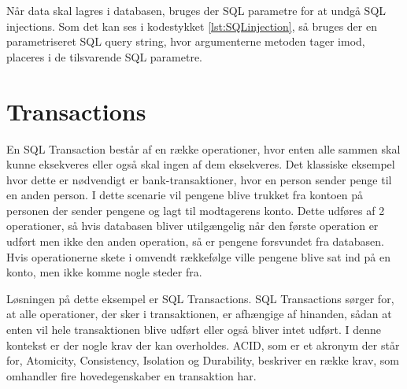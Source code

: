Når data skal lagres i databasen, bruges der SQL parametre for at undgå SQL injections. Som det kan ses i kodestykket \ref{lst:SQLinjection}, så bruges der en parametriseret SQL query string, hvor argumenterne metoden tager imod, placeres i de tilsvarende SQL parametre.


\section{Transactions}\label{sec:transactions}
En SQL Transaction \cite{sqltransaction} består af en række operationer, hvor enten alle sammen skal kunne eksekveres eller også skal ingen af dem eksekveres. Det klassiske eksempel hvor dette er nødvendigt er bank-transaktioner, hvor en person sender penge til en anden person. I dette scenarie vil pengene blive trukket fra kontoen på personen der sender pengene og lagt til modtagerens konto. Dette udføres af 2 operationer, så hvis databasen bliver utilgængelig når den første operation er udført men ikke den anden operation, så er pengene forsvundet fra databasen. Hvis operationerne skete i omvendt rækkefølge ville pengene blive sat ind på en konto, men ikke komme nogle steder fra. 

Løsningen på dette eksempel er SQL Transactions. SQL Transactions sørger for, at alle operationer, der sker i transaktionen, er afhængige af hinanden, sådan at enten vil hele transaktionen blive udført eller også bliver intet udført. I denne kontekst er der nogle krav der kan overholdes. ACID, som er et akronym der står for, Atomicity, Consistency, Isolation og Durability, beskriver en række krav, som omhandler fire hovedegenskaber en transaktion har. \cite{acid}

